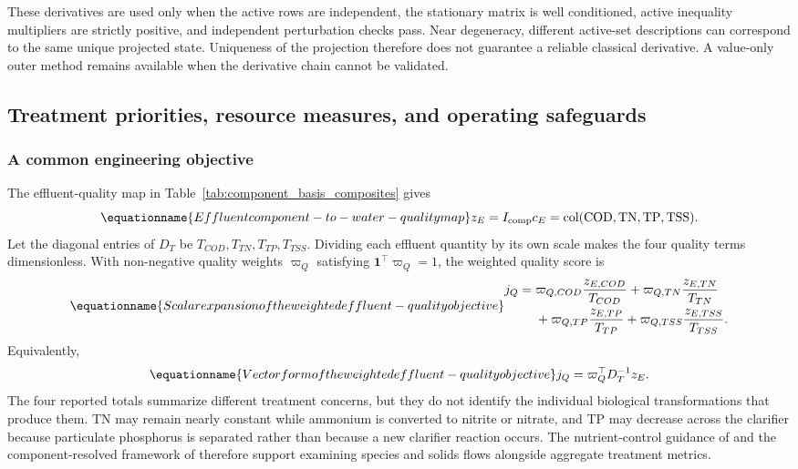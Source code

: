 These derivatives are used only when the active rows are independent, the stationary matrix is well conditioned, active inequality multipliers are strictly positive, and independent perturbation checks pass. Near degeneracy, different active-set descriptions can correspond to the same unique projected state. Uniqueness of the projection therefore does not guarantee a reliable classical derivative. A value-only outer method remains available when the derivative chain cannot be validated.

\subsection{Treatment priorities, resource measures, and operating safeguards}

\subsubsection{A common engineering objective}

The effluent-quality map in Table~\ref{tab:component_basis_composites} gives
\begin{equation}
\equationname{Effluent component-to-water-quality map}
z_E=I_{\rm comp}c_E=\operatorname{col}(\mathrm{COD},\mathrm{TN},\mathrm{TP},\mathrm{TSS}).
\end{equation}
Let the diagonal entries of $D_T$ be $T_{COD},T_{TN},T_{TP},T_{TSS}$. Dividing each effluent quantity by its own scale makes the four quality terms dimensionless. With non-negative quality weights $\varpi_Q$ satisfying $\mathbf1^\top\varpi_Q=1$, the weighted quality score is
\begin{equation}
\equationname{Scalar expansion of the weighted effluent-quality objective}
\begin{aligned}
j_Q={}&\varpi_{Q,COD}\frac{z_{E,COD}}{T_{COD}}
+\varpi_{Q,TN}\frac{z_{E,TN}}{T_{TN}}\\
&+\varpi_{Q,TP}\frac{z_{E,TP}}{T_{TP}}
+\varpi_{Q,TSS}\frac{z_{E,TSS}}{T_{TSS}}.
\end{aligned}
\end{equation}
Equivalently,
\begin{equation}
\equationname{Vector form of the weighted effluent-quality objective}
j_Q=\varpi_Q^\top D_T^{-1}z_E.
\label{eq:plant_quality_objective}
\end{equation}
The four reported totals summarize different treatment concerns, but they do not identify the individual biological transformations that produce them. TN may remain nearly constant while ammonium is converted to nitrite or nitrate, and TP may decrease across the clarifier because particulate phosphorus is separated rather than because a new clarifier reaction occurs. The nutrient-control guidance of \citet{USEPA2009} and the component-resolved framework of \citet{Zhang2026} therefore support examining species and solids flows alongside aggregate treatment metrics.

